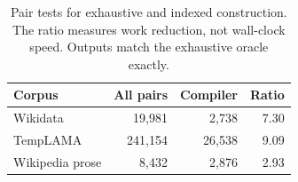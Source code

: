 \begin{table}[t]
\centering
\small
\begin{tabular}{lrrr}
\toprule
Corpus & All pairs & Compiler & Ratio \\
\midrule
Wikidata & 19,981 & 2,738 & 7.30 \\
TempLAMA & 241,154 & 26,538 & 9.09 \\
Wikipedia prose & 8,432 & 2,876 & 2.93 \\
\bottomrule
\end{tabular}
\caption{Pair tests for exhaustive and indexed construction. The ratio measures work reduction, not wall-clock speed. Outputs match the exhaustive oracle exactly.}
\label{tab:compiler}
\end{table}
